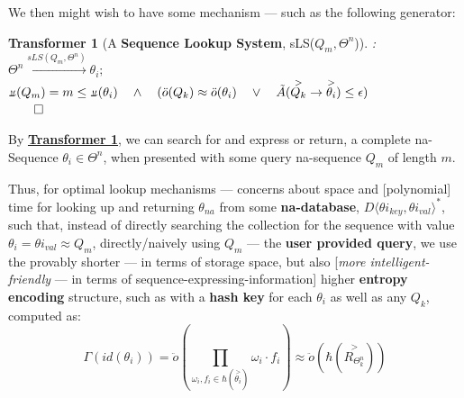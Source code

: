 \documentclass[a4paper, 18pt]{book} %
\newtheorem{transf}{Transformer}
\newcommand{\invpi}{\rotatebox[origin=c]{180}{$\pi$}}
\begin{document}
We then might wish to have some mechanism --- such as the following generator:\\


\begin{transf}[A \textbf{Sequence Lookup System}, sLS($Q_m,\Theta^n$)]:
\label{TRANSFSEQLOOKUP}
$ $\\
$\Theta^n \xrightarrow{sLS(Q_m,\Theta^n)} \theta_i;$\\ 
$\invpi(Q_m) = m \leq \invpi(\theta_i) \quad \land \quad (\ddot{o}(Q_k) \approx \ddot{o}(\theta_i) \quad \lor \quad \tilde{A}(\overset{>}{Q_k} \rightarrow \overset{>}{\theta_i}) \leq \epsilon)$\\
$\qed$
\end{transf}


By \textbf{\hyperref[TRANSFSEQLOOKUP]{Transformer \ref{TRANSFSEQLOOKUP}}}, we can search for and express or return, a complete na-Sequence $\theta_i \in \Theta^n$, when presented with some query na-sequence $Q_m$ of length $m$.

Thus, for optimal lookup mechanisms --- concerns about space and [polynomial] time for looking up and returning $\theta_{na}$ from some \textbf{na-database}, $D\langle {\theta i}_{key}, {\theta i}_{val} \rangle^*$, such that, instead of directly searching the collection for the sequence with value $\theta_i = {\theta i}_{val} \approx Q_m$, directly/naively using $Q_m$ --- the \textbf{user provided query}, we use the provably shorter --- in terms of storage space, but also [\textit{more intelligent-friendly} --- in terms of sequence-expressing-information] higher \textbf{entropy encoding} structure, such as with a \textbf{hash key} for each $\theta_i$ as well as any $Q_k$, computed as:\\

\begin{equation}
\label{EQHASHKEYSEQ}
 \Gamma (id(\theta_i)) = \ddot{o}(\prod\limits_{\omega_i,f_i \in \hbar(\overset{>}{\theta_i})} \omega_i\cdot f_i) \approx \ddot{o}(\hbar(\overset{>}{R_{\Theta^n_k}}))
\end{equation}\\
\end{document}
